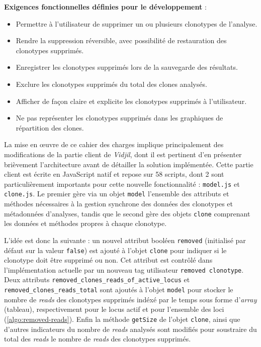 \vspace{1em}

\textbf{Exigences fonctionnelles définies pour le développement} :
\begin{itemize}
    \item Permettre à l'utilisateur de supprimer un ou plusieurs clonotypes de
          l'analyse.
    \item Rendre la suppression réversible, avec possibilité de restauration
          des clonotypes supprimés.
    \item Enregistrer les clonotypes supprimés lors de la sauvegarde des
          résultats.
    \item Exclure les clonotypes supprimés du total des clones analysés.
    \item Afficher de façon claire et explicite les clonotypes supprimés à
          l'utilisateur.
    \item Ne pas représenter les clonotypes supprimés dans les graphiques de
          répartition des clones.
\end{itemize}

\vspace{1em}

La mise en œuvre de ce cahier des charges implique principalement des
modifications de la partie client de \textit{Vidjil}, dont il est pertinent
d'en présenter brièvement l'architecture avant de détailler la solution
implémentée. Cette partie client est écrite en JavaScript natif et repose sur
58 scripts, dont 2 sont particulièrement importants pour cette nouvelle
fonctionnalité : \texttt{model.js} et \texttt{clone.js}. Le premier gère via un
objet \texttt{model} l'ensemble des attributs et méthodes nécessaires à la
gestion synchrone des données des clonotypes et métadonnées d'analyses, tandis
que le second gère des objets \texttt{clone} comprenant les données et méthodes
propres à chaque clonotype.

\vspace{1em}

L'idée est donc la suivante : un nouvel attribut booléen \texttt{removed}
(initialisé par défaut sur la valeur \texttt{false}) est ajouté à l'objet
\texttt{clone} pour indiquer si le clonotype doit être supprimé ou non. Cet
attribut est contrôlé dans l'implémentation actuelle par un nouveau tag
utilisateur \texttt{removed\ clonotype}. Deux attributs
\texttt{removed\_clones\_reads\_of\_active\_locus} et
\texttt{removed\_clones\_reads\_total} sont ajoutés à l'objet \texttt{model}
pour stocker le nombre de \textit{reads} des clonotypes supprimés indéxé par le
temps sous forme d'\textit{array} (tableau), respectivement pour le locus actif
et pour l'ensemble des loci (\autoref{algo:removed-reads}). Enfin la méthode
\texttt{getSize} de l'objet \texttt{clone}, ainsi que d'autres indicateurs du
nombre de \textit{reads} analysés sont modifiés pour soustraire du total des
\textit{reads} le nombre de \textit{reads} des clonotypes supprimés.

